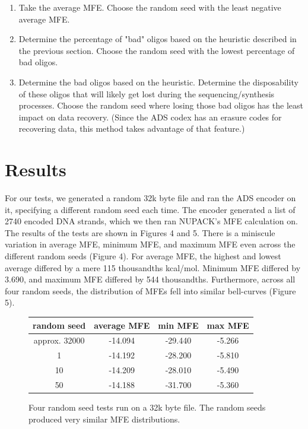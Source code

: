 \documentclass{article}
\begin{document}
\begin{enumerate}
    \item Take the average MFE. Choose the random seed with the least negative average MFE.
    \item Determine the percentage of "bad" oligos based on the heuristic described in the previous section. Choose the random seed with the lowest percentage of bad oligos.
    \item Determine the bad oligos based on the heuristic. Determine the disposability of these oligos that will likely get lost during the sequencing/synthesis processes. Choose the random seed where losing those bad oligos has the least impact on data recovery. (Since the ADS codex has an erasure codes for recovering data, this method takes advantage of that feature.) 
\end{enumerate}

\section{Results}

For our tests, we generated a random 32k byte file and ran the ADS encoder on it, specifying a different random seed each time. The encoder generated a list of 2740 encoded DNA strands, which we then ran NUPACK's MFE calculation on. The results of the tests are shown in Figures 4 and 5. There is a miniscule variation in average MFE, minimum MFE, and maximum MFE even across the different random seeds (Figure 4). For average MFE, the highest and lowest average differed by a mere 115 thousandths kcal/mol. Minimum MFE differed by 3.690, and maximum MFE differed by 544 thousandths. Furthermore, across all four random seeds, the distribution of MFEs fell into similar bell-curves (Figure 5).

\begin{figure}[!h]
\centering
\begin{tabular}{|c|c|c|c|}
\hline
 random seed & average MFE & min MFE & max MFE \\ 
 \hline
 approx. 32000	& -14.094 & -29.440 & -5.266 \\
 1 & -14.192 & -28.200 & -5.810 \\
 10 & -14.209 & -28.010 & -5.490 \\
 50 & -14.188 & -31.700 & -5.360 \\
 \hline
\end{tabular}
\caption{Four random seed tests run on a 32k byte file. The random seeds produced very similar MFE distributions.}
\end{figure}
\end{document}
